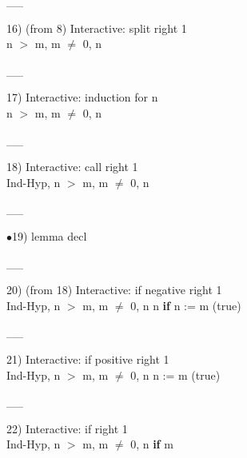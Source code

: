 \documentclass[a4paper]{article}
\begin{document}
\vspace{-1.5ex}\_\hrulefill \_

16)  (from 8) Interactive: split right  1\\
n $>$ m, m $\neq$ 0, n %

\vspace{-1.5ex}\_\hrulefill \_

17) Interactive: induction  for n\\
n $>$ m, m $\neq$ 0, n %

\vspace{-1.5ex}\_\hrulefill \_

18) Interactive: call right  1\\
Ind-Hyp, n $>$ m, m $\neq$ 0, n %

\vspace{-1.5ex}\_\hrulefill \_

$\bullet$19) lemma decl \\
 \Fol 

\vspace{-1.5ex}\_\hrulefill \_

20)  (from 18) Interactive: if negative right  1\\
\tabf Ind-Hyp, n $>$ m, m $\neq$ 0, n %
\Fol {} n %
 \tabf {} {\bf if} n %
 \tabf {}  := m\Dc
(true)

\vspace{-1.5ex}\_\hrulefill \_

21) Interactive: if positive right  1\\
\tabf Ind-Hyp, n $>$ m, m $\neq$ 0, n %
\Fol {} n %
 \tabf {}  := m\Dc
(true)

\vspace{-1.5ex}\_\hrulefill \_

22) Interactive: if right  1\\
\tabf Ind-Hyp, n $>$ m, m $\neq$ 0, n %
\Fol \Do 
{\bf if} m %
\end{document}
